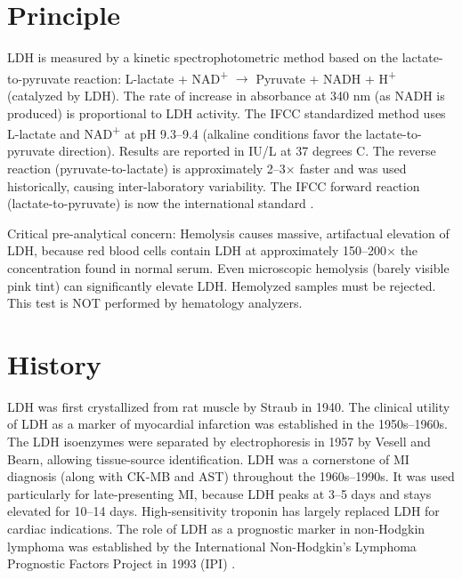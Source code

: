 \section*{Principle}
LDH is measured by a kinetic spectrophotometric method based on the lactate-to-pyruvate reaction: L-lactate + NAD\textsuperscript{+} $\rightarrow$ Pyruvate + NADH + H\textsuperscript{+} (catalyzed by LDH). The rate of increase in absorbance at 340 nm (as NADH is produced) is proportional to LDH activity. The IFCC standardized method uses L-lactate and NAD\textsuperscript{+} at pH 9.3--9.4 (alkaline conditions favor the lactate-to-pyruvate direction). Results are reported in IU/L at 37 degrees C. The reverse reaction (pyruvate-to-lactate) is approximately 2--3$\times$ faster and was used historically, causing inter-laboratory variability. The IFCC forward reaction (lactate-to-pyruvate) is now the international standard \cite{panteghini2023serum}.

Critical pre-analytical concern: Hemolysis causes massive, artifactual elevation of LDH, because red blood cells contain LDH at approximately 150--200$\times$ the concentration found in normal serum. Even microscopic hemolysis (barely visible pink tint) can significantly elevate LDH. Hemolyzed samples must be rejected. This test is NOT performed by hematology analyzers.

\section*{History}
LDH was first crystallized from rat muscle by Straub in 1940. The clinical utility of LDH as a marker of myocardial infarction was established in the 1950s--1960s. The LDH isoenzymes were separated by electrophoresis in 1957 by Vesell and Bearn, allowing tissue-source identification. LDH was a cornerstone of MI diagnosis (along with CK-MB and AST) throughout the 1960s--1990s. It was used particularly for late-presenting MI, because LDH peaks at 3--5 days and stays elevated for 10--14 days. High-sensitivity troponin has largely replaced LDH for cardiac indications. The role of LDH as a prognostic marker in non-Hodgkin lymphoma was established by the International Non-Hodgkin's Lymphoma Prognostic Factors Project in 1993 (IPI) \cite{international1993predictive}.

